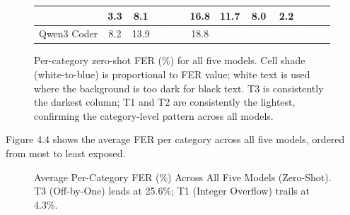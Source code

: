 \begin{figure}[h!]
{\begin{tabular}{l|c|c|c|c|c|c|c|c|}
        & \cellcolor{blue!7}\scriptsize 3.3
        & \cellcolor{blue!18}\scriptsize 8.1
        & \cellcolor{blue!62}\textcolor{white}{\scriptsize 27.7}
        & \cellcolor{blue!38}\scriptsize 16.8
        & \cellcolor{blue!26}\scriptsize 11.7
        & \cellcolor{blue!18}\scriptsize 8.0
        & \cellcolor{blue!5}\scriptsize 2.2
        & \cellcolor{blue!47}\textcolor{white}{\scriptsize 20.8} \\\hline
    \scriptsize Qwen3 Coder
        & \cellcolor{blue!18}\scriptsize 8.2
        & \cellcolor{blue!31}\scriptsize 13.9
        & \cellcolor{blue!49}\textcolor{white}{\scriptsize 21.8}
        & \cellcolor{blue!42}\scriptsize 18.8
        & \cellcolor{blue!49}\textcolor{white}{\scriptsize 21.7}
        & \cellcolor{blue!49}\textcolor{white}{\scriptsize 21.6}
        & \cellcolor{blue!46}\textcolor{white}{\scriptsize 20.5}
        & \cellcolor{blue!80}\textcolor{white}{\scriptsize 35.6} \\\hline
\end{tabular}}
\caption{Per-category zero-shot FER (\%) for all five models. Cell shade (white-to-blue) is proportional to FER value; white text is used where the background is too dark for black text. T3 is consistently the darkest column; T1 and T2 are consistently the lightest, confirming the category-level pattern across all models.}
\label{fig:heatmap}
\end{figure}

Figure 4.4 shows the average FER per category across all five models, ordered from most to least exposed.

\begin{figure}[h!]
    \centering
    \caption{Average Per-Category FER (\%) Across All Five Models (Zero-Shot). T3 (Off-by-One) leads at 25.6\%; T1 (Integer Overflow) trails at 4.3\%.}
    \label{fig:per_category_avg}
\end{figure}

